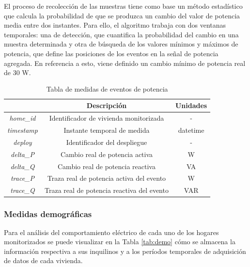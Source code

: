 \vspace{3mm}

El proceso de recolección de las muestras tiene como base un método estadístico que calcula la probabilidad de que se produzca un cambio del valor de potencia media entre dos instantes. Para ello, el algoritmo trabaja con dos ventanas temporales: una de detección, que cuantifica la probabilidad del cambio en una muestra determinada y otra de búsqueda de los valores mínimos y máximos de potencia, que define las posiciones de los eventos en la señal de potencia agregada. En referencia a esto, viene definido un cambio mínimo de potencia real de 30 W.

\vspace{3mm}

\begin{table}[h!]
    \centering
    \begin{tabular}{|c|c|c|}
    \hline
    \rowcolor[HTML]{AAAAAA} 
    \multicolumn{1}{|c|}{\cellcolor[HTML]{AAAAAA}Campo} & \multicolumn{1}{c|}{\cellcolor[HTML]{AAAAAA}Descripción} & Unidades \\ \hline
    \textit{home\_id} & Identificador de vivienda monitorizada & - \\ \hline
    \textit{timestamp} & Instante temporal de medida & datetime \\ \hline
    \textit{deploy} & Identificador del despliegue & - \\ \hline
    \textit{delta\_P} & Cambio real de potencia activa & W \\ \hline
    \textit{delta\_Q} & Cambio real de potencia reactiva & VA \\ \hline
    \textit{trace\_P} & Traza real de potencia activa del evento & W \\ \hline
    \textit{trace\_Q} & Traza real de potencia reactiva del evento & VAR \\ \hline
    \end{tabular}
    \caption{Tabla de medidas de eventos de potencia \cite{sustdata}}
    \label{tab:eventos}
\end{table}

\subsubsection{Medidas demográficas}
\label{sec:demographic}

Para el análisis del comportamiento eléctrico de cada uno de los hogares monitorizados se puede visualizar en la Tabla \ref{tab:demo} cómo se almacena la información respectiva a sus inquilinos y a los períodos temporales de adquisición de datos de cada vivienda.

